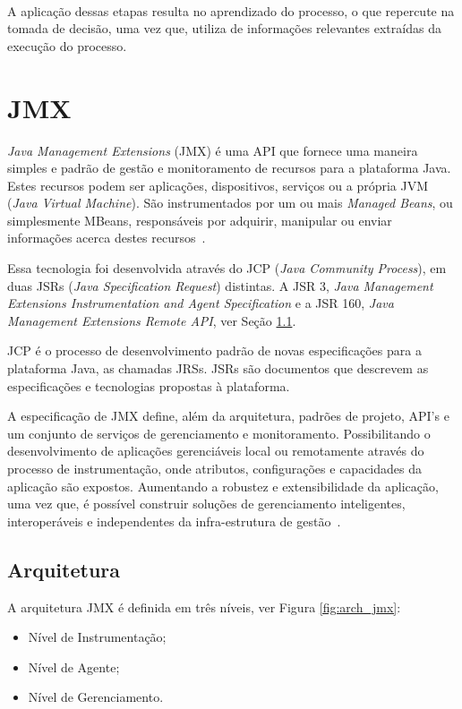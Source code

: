 \paragraph{}
A aplicação dessas etapas resulta no aprendizado do processo, o que repercute na tomada de decisão, uma vez que, utiliza de informações relevantes extraídas da execução do processo.

\section{JMX}
\textit{Java Management Extensions} (JMX) é uma API que fornece uma maneira simples e padrão de gestão e monitoramento de recursos para a plataforma Java. Estes recursos podem ser aplicações, dispositivos, serviços ou a própria JVM (\textit{Java Virtual Machine}). São instrumentados por um ou mais \textit{Managed Beans}, ou simplesmente MBeans, responsáveis por adquirir, manipular ou enviar informações acerca destes recursos~\cite{lindfors2002jmx}.

Essa tecnologia foi desenvolvida através do JCP (\textit{Java Community Process}), em duas JSRs (\textit{Java Specification Request}) distintas. A JSR 3, \textit{Java Management Extensions Instrumentation and Agent Specification} e a JSR 160, \textit{Java Management Extensions Remote API}, ver Seção \ref{subsec:arch}.

JCP é o processo de desenvolvimento padrão de novas especificações para a plataforma Java, as chamadas JRSs. JSRs são documentos que descrevem as especificações e tecnologias propostas à plataforma.

A especificação de JMX define, além da arquitetura, padrões de projeto, API's e um conjunto de serviços de gerenciamento e monitoramento. Possibilitando o desenvolvimento de aplicações gerenciáveis local ou remotamente através do processo de instrumentação, onde atributos, configurações e capacidades da aplicação são expostos. Aumentando a robustez e extensibilidade da aplicação, uma vez que, é possível construir soluções de gerenciamento inteligentes, interoperáveis e independentes da infra-estrutura de gestão~\cite{jmx}.

\subsection{Arquitetura}
\label{subsec:arch}
A arquitetura JMX é definida em três níveis, ver Figura \ref{fig:arch_jmx}:

\begin{itemize}
 \item Nível de Instrumentação;
 \item Nível de Agente;
 \item Nível de Gerenciamento.
\end{itemize}

